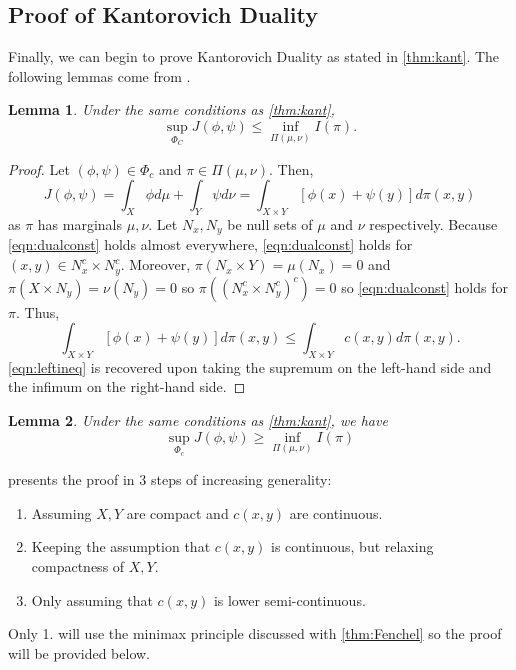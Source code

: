 \documentclass[12pt]{article}
\theoremstyle{plain}
\newtheorem{lem}{Lemma}[section]
\numberwithin{equation}{section}
\begin{document}
\subsection{Proof of Kantorovich Duality}
Finally, we can begin to prove Kantorovich Duality as stated in \autoref{thm:kant}. The following lemmas come from \cite{villani}.
\begin{lem}\label{lem:kant1}
  Under the same conditions as \autoref{thm:kant}, 
  \begin{equation}\label{eqn:leftineq}\sup_{\Phi_C} J(\phi,\psi) \le \inf_{\Pi(\mu,\nu)} I(\pi).\end{equation}
\end{lem}
\begin{proof}
  Let $(\phi,\psi) \in \Phi_c$ and $\pi\in \Pi(\mu,\nu)$. Then,
  \[J(\phi,\psi) = \int_X\phi d\mu + \int_Y\psi d\nu = \int_{X\times Y}[\phi(x)+\psi(y)]d\pi(x,y)\]
  as $\pi$ has marginals $\mu,\nu$.\newline
  Let $N_x,N_y$ be null sets of $\mu$ and $\nu$ respectively. Because \autoref{eqn:dualconst} holds almost everywhere, \autoref{eqn:dualconst} holds for 
  $(x,y)\in N_x^c \times N_y^c$. Moreover, $\pi(N_x\times Y) = \mu(N_x) = 0$ and $\pi(X\times N_y) = \nu(N_y) = 0$ so $\pi((N_x^c\times N_y^c)^c) = 0$ so \autoref{eqn:dualconst} holds for $\pi$. Thus,
  \begin{equation}
    \int_{X\times Y}[\phi(x)+\psi(y)]d\pi(x,y) \le \int_{X\times Y}c(x,y)d\pi(x,y).
  \end{equation}
  \autoref{eqn:leftineq} is recovered upon taking the supremum on the left-hand side and the infimum on the right-hand side.
\end{proof}
\begin{lem}\label{lem:kant2}
  Under the same conditions as \autoref{thm:kant}, we have 
  \[\sup_{\Phi_c} J(\phi,\psi) \ge \inf_{\Pi(\mu,\nu)} I(\pi)\]
\end{lem}
\cite{villani} presents the proof in 3 steps of increasing generality:
  \begin{enumerate}[1.]
    \item Assuming $X,Y$ are compact and $c(x,y)$ are continuous.
    \item Keeping the assumption that $c(x,y)$ is continuous, but relaxing compactness of $X,Y$.
    \item Only assuming that $c(x,y)$ is lower semi-continuous.
  \end{enumerate}
  Only 1. will use the minimax principle discussed with \autoref{thm:Fenchel} so the proof will be provided below.
\end{document}
